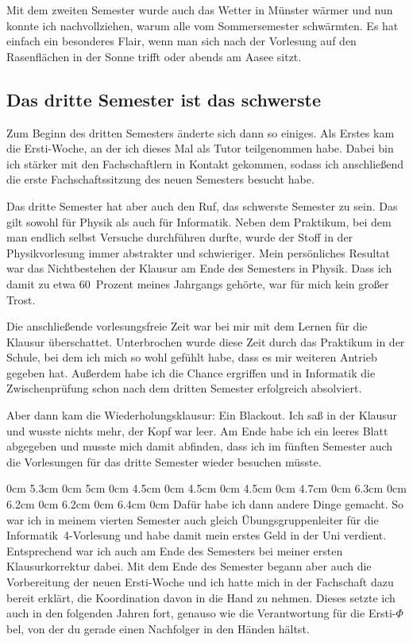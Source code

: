 \begin{multicols*}{2}
Mit dem zweiten Semester wurde auch das Wetter in Münster wärmer und nun konnte ich nachvollziehen, warum alle vom Sommersemester schwärmten.
Es hat einfach ein besonderes Flair, wenn man sich nach der Vorlesung auf den Rasenflächen in der Sonne trifft oder abends am Aasee sitzt.

\subsection{Das dritte Semester ist das schwerste}
Zum Beginn des dritten Semesters änderte sich dann so einiges.
Als Erstes kam die Ersti-Woche, an der ich dieses Mal als Tutor teilgenommen habe.
Dabei bin ich stärker mit den Fachschaftlern in Kontakt gekommen, sodass ich anschließend die erste Fachschaftssitzung des neuen Semesters besucht habe.

Das dritte Semester hat aber auch den Ruf, das schwerste Semester zu sein.
Das gilt sowohl für Physik als auch für Informatik.
Neben dem Praktikum, bei dem man endlich selbst Versuche durchführen durfte, wurde der Stoff in der Physikvorlesung immer abstrakter und schwieriger.
Mein persönliches Resultat war das Nichtbestehen der Klausur am Ende des Semesters in Physik.
Dass ich damit zu etwa 60~Prozent meines Jahrgangs gehörte, war für mich kein großer Trost.

Die anschließende vorlesungsfreie Zeit war bei mir mit dem Lernen für die Klausur überschattet.
Unterbrochen wurde diese Zeit durch das Praktikum in der Schule, bei dem ich mich so wohl gefühlt habe, dass es mir weiteren Antrieb gegeben hat.
Außerdem habe ich die Chance ergriffen und in Informatik die Zwischenprüfung schon nach dem dritten Semester erfolgreich absolviert.

Aber dann kam die Wiederholungsklausur: Ein Blackout.
Ich saß in der Klausur und wusste nichts mehr, der Kopf war leer.
Am Ende habe ich ein leeres Blatt abgegeben und musste mich damit abfinden, dass ich im fünften Semester auch die Vorlesungen für das dritte Semester wieder besuchen müsste.

0cm \columnwidth
0cm \columnwidth
0cm \columnwidth
0cm \columnwidth
0cm \columnwidth
0cm \columnwidth
0cm 5.3cm
0cm 5cm
0cm 4.5cm
0cm 4.5cm
0cm 4.5cm
0cm 4.7cm
0cm 6.3cm
0cm 6.2cm
0cm 6.2cm
0cm 6.4cm
0cm \columnwidth
Dafür habe ich dann andere Dinge gemacht.
So war ich in meinem vierten Semester auch gleich Übungsgruppenleiter für die Informatik~4-Vorlesung und habe damit mein erstes Geld in der Uni verdient.
Entsprechend war ich auch am Ende des Semesters bei meiner ersten Klausurkorrektur dabei.
Mit dem Ende des Semester begann aber auch die Vorbereitung der neuen Ersti-Woche und ich hatte mich in der Fachschaft dazu bereit erklärt, die Koordination davon in die Hand zu nehmen.
Dieses setzte ich auch in den folgenden Jahren fort, genauso wie die Verantwortung für die Ersti-$\Phi$bel, von der du gerade einen Nachfolger in den Händen hältst.


\end{multicols*}
